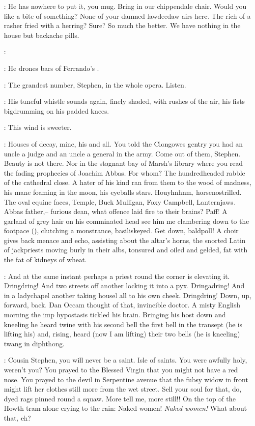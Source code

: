 \richie:
He has nowhere to put it, you mug.
Bring in our chippendale chair.
Would you like a bite of something?
None of your damned lawdeedaw airs here.
The rich of a rasher fried with a herring?
Sure?
So much the better.
We have nothing in the house but backache pills.

\richie:

:
He drones bars of Ferrando's .

\richie:
The grandest number, Stephen,
in the whole opera.
Listen.

:
His tuneful whistle sounds again, finely shaded,
with rushes of the air,
his fists bigdrumming on his padded knees.

\StephenInt:
This wind is sweeter.

\StephenInt:
Houses of decay, mine, his and all.
You told the Clongowes gentry
you had an uncle a judge
and an uncle a general in the army.
Come out of them, Stephen.
Beauty is not there.
Nor in the stagnant bay of Marsh's library
where you read the fading prophecies of Joachim Abbas.
For whom?
The hundredheaded rabble of the cathedral close.
A hater of his kind ran from them to the wood of madness,
his mane foaming in the moon, his eyeballs stars.
Houyhnhnm, horsenostrilled.
The oval equine faces,
Temple, Buck Mulligan, Foxy Campbell, Lanternjaws.
Abbas father,--
furious dean, what offence laid fire to their brains?
Paff!
A garland of grey hair on his comminated head
see him me clambering down to the footpace (),
clutching a monstrance, basiliskeyed.
Get down, baldpoll!
A choir gives back menace and echo,
assisting about the altar's horns,
the snorted Latin of jackpriests
moving burly in their albs,
tonsured and oiled and gelded,
fat with the fat of kidneys of wheat.

\StephenInt:
And at the same instant
perhaps a priest round the corner is elevating it.
Dringdring!
And two streets off
another locking it into a pyx.
Dringadring!
And in a ladychapel
another taking housel all to his own cheek.
Dringdring!
Down, up, forward, back.
Dan Occam thought of that,
invincible doctor.
A misty English morning
the imp hypostasis tickled his brain.
Bringing his host down and kneeling
he heard twine with his second bell
the first bell in the transept
(he is lifting his)
and, rising, heard
(now I am lifting)
their two bells
(he is kneeling)
twang in diphthong.

\StephenInt:
Cousin Stephen, you will never be a saint.
Isle of saints.
You were awfully holy, weren't you?
You prayed to the Blessed Virgin
that you might not have a red nose.
You prayed to the devil in Serpentine avenue
that the fubsy widow in front might lift her clothes
still more from the wet street.
Sell your soul for that, do, dyed rags pinned round a squaw.
More tell me, more still!!
On the top of the Howth tram alone crying to the rain:
Naked women!
\emph{Naked women!}
What about that, eh?

